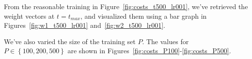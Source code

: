 From the reasonable training in Figure~\ref{fig:costs_t500_lr001}, we've retrieved the weight vectors at \(t = t_{max}\), and visualized them using a bar graph in Figures~\ref{fig:w1_t500_lr001} and~\ref{fig:w2_t500_lr001}.


We've also varied the size of the training set \(P\).
The values for \( P \in \left\{100, 200, 500\right\}\) are shown in Figures~\ref{fig:costs_P100}-\ref{fig:costs_P500}.

